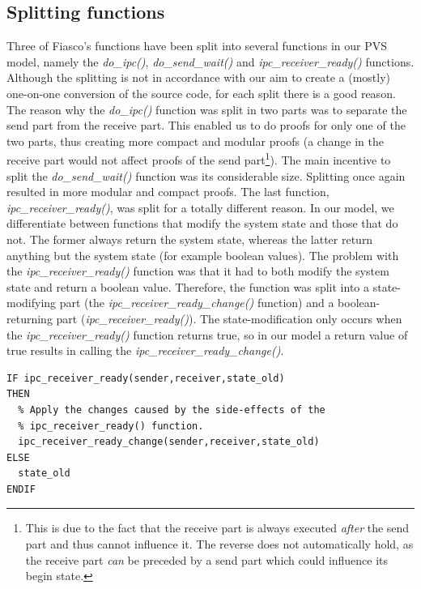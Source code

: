 \subsection{Splitting functions}
Three of Fiasco's functions have been split into several functions in our PVS model, namely the \emph{do\_ipc()}, \emph{do\_send\_wait()} and \emph{ipc\_receiver\_ready()} functions. Although the splitting is not in accordance with our aim to create a (mostly) one-on-one conversion of the source code, for each split there is a good reason. The reason why the \emph{do\_ipc()} function was split in two parts was to separate the send part from the receive part. This enabled us to do proofs for only one of the two parts, thus creating more compact and modular proofs (a change in the receive part would not affect proofs of the send part\footnote{This is due to the fact that the receive part is always executed \textit{after} the send part and thus cannot influence it. The reverse does not automatically hold, as the receive part \textit{can} be preceded by a send part which could influence its begin state.}). The main incentive to split the \emph{do\_send\_wait()} function was its considerable size. Splitting once again resulted in more modular and compact proofs. The last function, \emph{ipc\_receiver\_ready()}, was split for a totally different reason. In our model, we differentiate between functions that modify the system state and those that do not. The former always return the system state, whereas the latter return anything but the system state (for example boolean values). The problem with the \emph{ipc\_receiver\_ready()} function was that it had to both modify the system state and return a boolean value. Therefore, the function was split into a state-modifying part (the \emph{ipc\_receiver\_ready\_change()} function) and a boolean-returning part (\emph{ipc\_receiver\_ready()}). The state-modification only occurs when the \emph{ipc\_receiver\_ready()} function returns true, so in our model a return value of true results in calling the \emph{ipc\_receiver\_ready\_change()}.

\lstset{language=PVS}
\begin{lstlisting}[caption={PVS: calling the split \emph{ipc\_receiver\_ready()} function.}]
% Check if the sender is ready for the receiver.
IF ipc_receiver_ready(sender,receiver,state_old)
THEN
  % Apply the changes caused by the side-effects of the 
  % ipc_receiver_ready() function.
  ipc_receiver_ready_change(sender,receiver,state_old)
ELSE
  state_old
ENDIF
\end{lstlisting}

